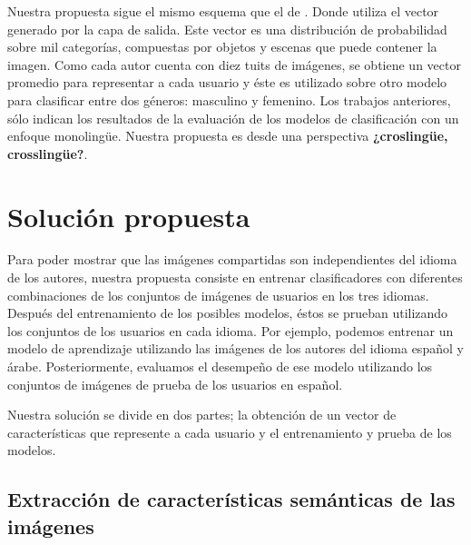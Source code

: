 \documentclass[runningheads]{llncs}
\begin{document}
Nuestra propuesta sigue el mismo esquema que el de \cite{aragon2018straightforward}.
Donde utiliza el vector generado por la capa de salida. Este vector es una
distribución de probabilidad sobre mil categorías, compuestas por objetos y escenas
que puede contener la imagen. Como cada autor cuenta con diez tuits de imágenes,
se obtiene un vector promedio para representar a cada usuario y éste es utilizado sobre otro modelo para clasificar entre dos géneros: masculino y femenino. 
Los trabajos anteriores, sólo indican los resultados de la evaluación de los
modelos de clasificación con un enfoque monolingüe. Nuestra propuesta es desde
una perspectiva \textbf{¿croslingüe, crosslingüe?}.




\section{Solución propuesta}

Para poder mostrar que las imágenes compartidas son independientes
del idioma de los autores, nuestra propuesta consiste en entrenar clasificadores
con diferentes combinaciones de los conjuntos de imágenes de usuarios en los
tres idiomas. Después del entrenamiento de los posibles modelos, éstos se
prueban utilizando los conjuntos de los usuarios en cada idioma. Por ejemplo,
podemos entrenar un modelo de aprendizaje utilizando las imágenes de los
autores del idioma español y árabe. Posteriormente, evaluamos el desempeño
de ese modelo utilizando los conjuntos de imágenes de prueba de los usuarios
en español.

Nuestra solución se divide en dos partes; la obtención de un vector
de características que represente a cada usuario y el entrenamiento y 
prueba de los modelos. 

\subsection{Extracción de características semánticas de las imágenes}
\end{document}
